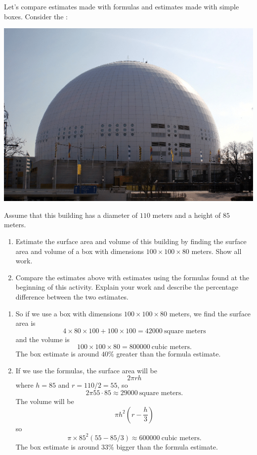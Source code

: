 \documentclass[handout,nooutcomes,noauthor,hints1,12pt]{ximera}
\begin{document}
\begin{question} \label{FG1:1}
  Let's compare estimates made with formulas and estimates made with
  simple boxes. Consider the :
   \begin{center}
    \includegraphics[width=.4\textwidth]{dome.png} %
   \end{center}
   Assume that this building has a diameter of $110$ meters and a
   height of $85$ meters.
  
\begin{enumerate}
\item Estimate the surface area and volume of this building by finding
  the surface area and volume of a box with dimensions $100\times 100
  \times 80$ meters. Show all work.
\item Compare the estimates above with estimates using the formulas
  found at the beginning of this activity. Explain your work and
  describe the percentage difference between the two estimates.
\end{enumerate}
\begin{freeResponse}
  \begin{enumerate}
  \item So if we use a box with dimensions $100\times 100 \times 80$ meters,
    we find the surface area is
    \[
    4\times 80 \times 100 +100\times 100= 42000~\text{square meters}
    \]
    and the volume is
    \[
    100\times 100 \times 80 = 800000~\text{cubic meters.}
    \]
    The box estimate is around $40\%$ greater than the formula
    estimate.
  \item If we use the formulas, the surface area will be
    \[
    2\pi rh
    \]
    where $h=85$ and $r= 110/2 = 55$, so
    \[
    2\pi 55\cdot 85 \approx  29000~\text{square meters}.
    \]
    The volume will be
    \[
    \pi h^2 \left( r- \frac{h}{3}\right)
    \]
    so
    \[
    \pi \times 85^2 (55 - 85/3) \approx 600000 ~\text{cubic meters.}
    \]
    The box estimate is around $33\%$ bigger than the formula
    estimate.
  \end{enumerate}
\end{freeResponse}
   \end{question}
\mynewpage
\end{document}
